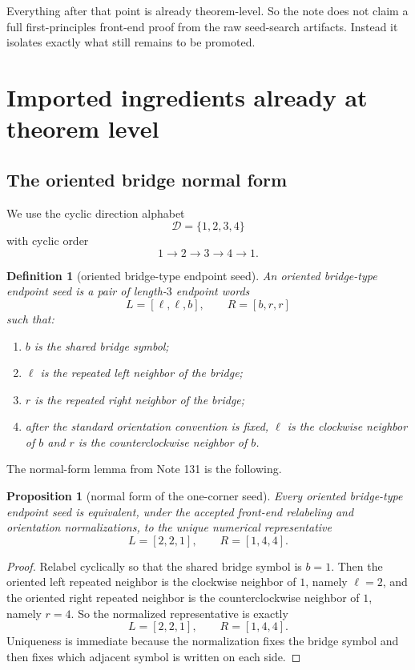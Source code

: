 \documentclass[11pt]{article}
\newtheorem{proposition}[theorem]{Proposition}
\newtheorem{definition}[theorem]{Definition}
\begin{document}
Everything after that point is already theorem-level.
So the note does not claim a full first-principles front-end proof from the raw
seed-search artifacts.
Instead it isolates exactly what still remains to be promoted.

\section{Imported ingredients already at theorem level}

\subsection{The oriented bridge normal form}

We use the cyclic direction alphabet
\[
\mathcal D=\{1,2,3,4\}
\]
with cyclic order
\[
1\to 2\to 3\to 4\to 1.
\]

\begin{definition}[oriented bridge-type endpoint seed]
An \emph{oriented bridge-type endpoint seed} is a pair of length-$3$ endpoint
words
\[
L=[\ell,\ell,b],\qquad R=[b,r,r]
\]
such that:
\begin{enumerate}[label=\textup{(\roman*)},leftmargin=2.5em]
\item $b$ is the shared bridge symbol;
\item $\ell$ is the repeated left neighbor of the bridge;
\item $r$ is the repeated right neighbor of the bridge;
\item after the standard orientation convention is fixed, $\ell$ is the
      clockwise neighbor of $b$ and $r$ is the counterclockwise neighbor of
      $b$.
\end{enumerate}
\end{definition}

The normal-form lemma from Note \textup{131} is the following.

\begin{proposition}[normal form of the one-corner seed]
\label{prop:normal-form}
Every oriented bridge-type endpoint seed is equivalent, under the accepted
front-end relabeling and orientation normalizations, to the unique numerical
representative
\[
L=[2,2,1],\qquad R=[1,4,4].
\]
\end{proposition}

\begin{proof}
Relabel cyclically so that the shared bridge symbol is $b=1$.
Then the oriented left repeated neighbor is the clockwise neighbor of $1$,
namely $\ell=2$, and the oriented right repeated neighbor is the
counterclockwise neighbor of $1$, namely $r=4$.
So the normalized representative is exactly
\[
L=[2,2,1],\qquad R=[1,4,4].
\]
Uniqueness is immediate because the normalization fixes the bridge symbol and
then fixes which adjacent symbol is written on each side.
\end{proof}
\end{document}

